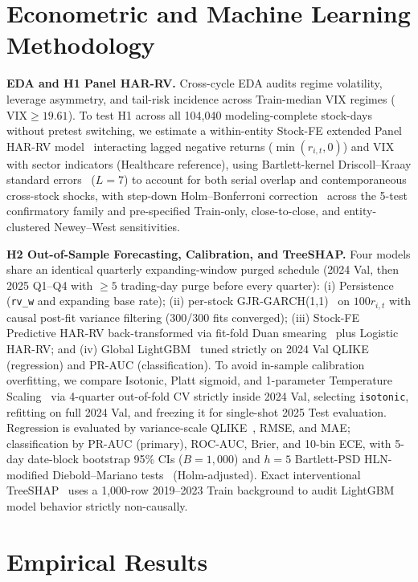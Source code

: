 \documentclass[11pt,a4paper]{article}
\begin{document}
\section{Econometric and Machine Learning Methodology}

\textbf{EDA and H1 Panel HAR-RV.} Cross-cycle EDA audits regime volatility,
leverage asymmetry, and tail-risk incidence across Train-median VIX regimes
($\text{VIX} \ge 19.61$). To test H1 across all 104,040
modeling-complete stock-days without pretest switching, we estimate a
within-entity Stock-FE extended Panel HAR-RV model~\cite{corsi2009}
interacting lagged negative returns ($\min(r_{i,t}, 0)$) and VIX with sector
indicators (Healthcare reference), using Bartlett-kernel Driscoll--Kraay
standard errors~\cite{driscoll1998} ($L=7$) to account for both
serial overlap and contemporaneous cross-stock shocks, with step-down
Holm--Bonferroni correction~\cite{holm1979} across the 5-test confirmatory
family and pre-specified Train-only, close-to-close, and entity-clustered
Newey--West sensitivities.

\textbf{H2 Out-of-Sample Forecasting, Calibration, and TreeSHAP.} Four models
share an identical quarterly expanding-window purged schedule (2024 Val, then
2025 Q1--Q4 with $\ge 5$ trading-day purge before every quarter): (i)
Persistence (\texttt{rv\_w} and expanding base rate); (ii) per-stock
GJR-GARCH(1,1)~\cite{glosten1993} on $100r_{i,t}$ with causal post-fit
variance filtering (300/300 fits converged); (iii) Stock-FE Predictive
HAR-RV back-transformed via fit-fold Duan smearing~\cite{duan1983} plus
Logistic HAR-RV; and (iv) Global LightGBM~\cite{ke2017lightgbm} tuned strictly
on 2024 Val QLIKE (regression) and PR-AUC (classification). To avoid in-sample
calibration overfitting, we compare Isotonic, Platt sigmoid, and 1-parameter
Temperature Scaling~\cite{guo2017calibration} via 4-quarter out-of-fold CV
strictly inside 2024 Val, selecting \texttt{isotonic}, refitting on
full 2024 Val, and freezing it for single-shot 2025 Test evaluation. Regression
is evaluated by variance-scale QLIKE~\cite{patton2011}, RMSE, and MAE;
classification by PR-AUC (primary), ROC-AUC, Brier, and 10-bin ECE, with 5-day
date-block bootstrap 95\% CIs ($B=1{,}000$) and $h=5$ Bartlett-PSD HLN-modified
Diebold--Mariano tests~\cite{harvey1997} (Holm-adjusted). Exact interventional
TreeSHAP~\cite{lundberg2020treeshap} uses a 1,000-row 2019--2023
Train background to audit LightGBM model behavior strictly non-causally.

\section{Empirical Results}
\end{document}
